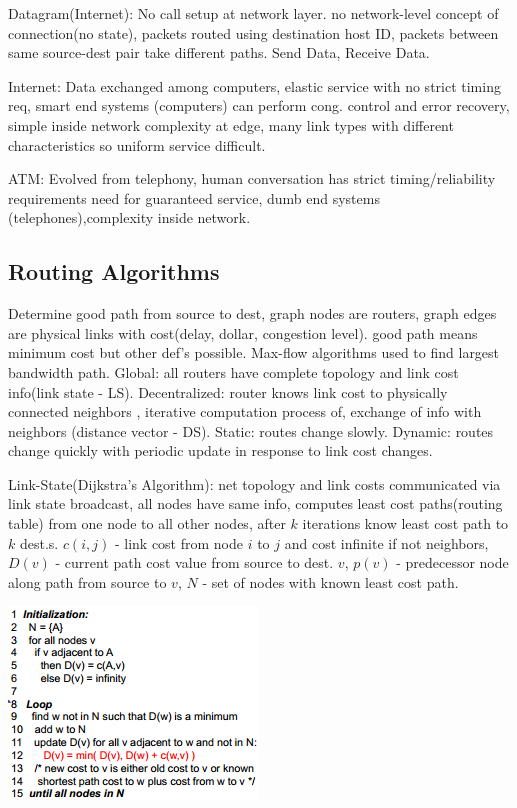 \documentclass[8pt]{extarticle}
\begin{document}
\begin{multicols}{2}
Datagram(Internet): No call setup at network layer. no network-level concept of connection(no state), packets routed using destination host ID, packets between same source-dest pair take different paths. Send Data, Receive Data.

Internet: Data exchanged among computers, elastic service with no strict timing req, smart end systems (computers) can perform cong. control and error recovery, simple inside network complexity at edge, many link types with different characteristics so uniform service difficult.

ATM: Evolved from telephony, human conversation has strict timing/reliability requirements need for guaranteed service, dumb end systems (telephones),complexity inside network.

\subsection{Routing Algorithms}

Determine good path from source to dest, graph nodes are routers, graph edges are physical links with cost(delay, dollar, congestion level). good path means minimum cost but other def’s possible. Max-flow algorithms used to find largest bandwidth path. Global: all routers have complete topology and link cost info(link state - LS). Decentralized: router knows link cost to physically connected neighbors , iterative computation process of, exchange of info with neighbors (distance vector - DS). Static: routes change slowly. Dynamic: routes change quickly with periodic update in response to link cost changes.

Link-State(Dijkstra's Algorithm): net topology and link costs communicated via link state broadcast, all nodes have same info, computes least cost paths(routing table) from one node to all other nodes, after $k$ iterations know least cost path to $k$ dest.s. $c(i,j)$ - link cost from node $i$ to $j$ and cost infinite if not neighbors, $D(v)$ - current path cost value from source to dest. $v$, $p(v)$ - predecessor node along path from source to $v$, $N$ - set of nodes with known least cost path. 

\includegraphics{dijkstra.png}


\end{multicols}
\end{document}
